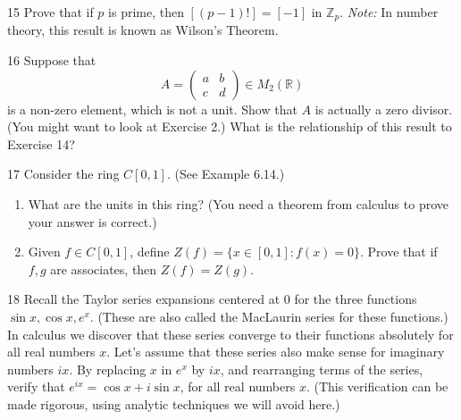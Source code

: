\begin{problem}{15}
    Prove that if $p$ is prime, then $[(p - 1)!] = [-1]$ in $\mathbb{Z}_p$.
    \emph{Note:} In number theory, this result is known as Wilson's Theorem.
\end{problem}
\unsolved

\begin{problem}{16}
    Suppose that
    \[A = \begin{pmatrix} a & b \\ c & d \end{pmatrix} \in M_2(\mathbb{R})\]
    is a non-zero element, which is not a unit. Show that $A$ is actually a zero divisor.
    (You might want to look at Exercise 2.) What is the relationship of this result to
    Exercise 14?
\end{problem}
\unsolved

\begin{problem}{17}
    Consider the ring $C[0, 1]$. (See Example 6.14.)
    \begin{enumerate}
        \item[(a)] What are the units in this ring? (You need a theorem from calculus to
        prove your answer is correct.)
        \item[(b)] Given $f \in C[0, 1]$, define $Z(f) = \{x \in [0, 1] : f(x) = 0\}$.
        Prove that if $f, g$ are associates, then $Z(f) = Z(g)$.
    \end{enumerate}
\end{problem}
\unsolved

\begin{problem}{18}
    Recall the Taylor series expansions centered at 0 for the three functions
    $\sin x, \cos x, e^x$. (These are also called the MacLaurin series for these
    functions.) In calculus we discover that these series converge to their functions
    absolutely for all real numbers $x$. Let's assume that these series also make sense
    for imaginary numbers $ix$. By replacing $x$ in $e^x$ by $ix$, and rearranging terms
    of the series, verify that $e^{ix} = \cos x + i \sin x$, for all real numbers $x$.
    (This verification can be made rigorous, using analytic techniques we will avoid
    here.)
\end{problem}
\unsolved
